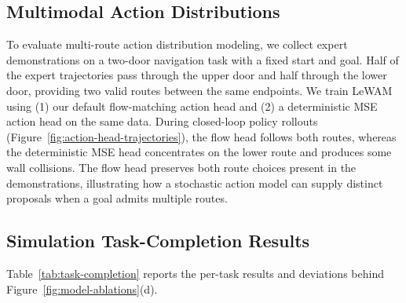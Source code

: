 \documentclass{article} %
\newcommand{\methodname}[1]{\textup{#1}}
\newcommand{\method}{\methodname{LeWAM}}
\begin{document}

\label{tab:latent-probing-full}
\FloatBarrier



\subsection{Multimodal Action Distributions}
\label{app:action-distributions}

To evaluate multi-route action distribution modeling, we collect expert demonstrations on a two-door navigation task with a fixed start and goal. Half of the expert trajectories pass through the upper door and half through the lower door, providing two valid routes between the same endpoints. We train \method{} using (1) our default flow-matching action head and (2) a deterministic MSE action head on the same data. During closed-loop policy rollouts (Figure~\ref{fig:action-head-trajectories}), the flow head follows both routes, whereas the deterministic MSE head
concentrates on the lower route and produces some wall collisions. The flow head preserves both route choices present in the demonstrations, illustrating how a stochastic action model can supply distinct proposals when a goal admits multiple routes.


\FloatBarrier

\subsection{Simulation Task-Completion Results}
\label{app:simulation-completion-results}
Table~\ref{tab:task-completion} reports the per-task results and deviations behind Figure~\ref{fig:model-ablations}(d).


\FloatBarrier


\clearpage

\end{document}

